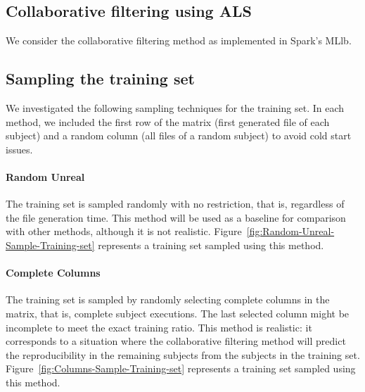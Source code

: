 \documentclass[10pt, conference, compsocconf]{IEEEtran}
\begin{document}
\subsection{Collaborative filtering using ALS}

We consider the collaborative filtering method as implemented in Spark's MLlb.




\subsection{Sampling the training set}

We investigated the following sampling techniques for the training set. 
In each method, we included the first row of the matrix (first 
generated file of each subject) and a random column (all files of a 
random subject) to avoid cold start issues. 

\paragraph{Random Unreal}
The training set is sampled randomly with no restriction, that is,
regardless of the file generation time. This method will be used as a
baseline for comparison with other methods, although it is not
realistic. Figure~\ref{fig:Random-Unreal-Sample-Training-set} represents 
a training set sampled using this method.


\paragraph{Complete Columns}
The training set is sampled by randomly selecting complete columns in
the matrix, that is, complete subject executions. The last selected
column might be incomplete to meet the exact training ratio. This 
method is realistic: it corresponds to a situation where the 
collaborative filtering method will predict the reproducibility in the 
remaining subjects from the subjects in the training set. 
Figure~\ref{fig:Columns-Sample-Training-set} represents a training set 
sampled using this method.


\end{document}
